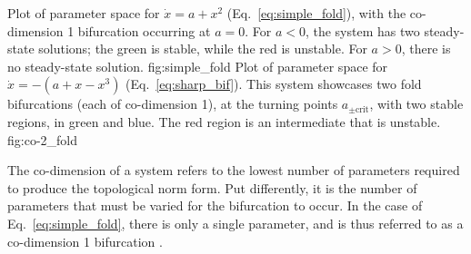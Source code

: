 	{Plot of parameter space for $\dot{x} = a + x^2$ (Eq.~\ref{eq:simple_fold}), with the co-dimension 1 bifurcation occurring at $a = 0$. %
	For $a < 0$, the system has two steady-state solutions; the green is stable, while the red is unstable.
	For $a > 0$, there is no steady-state solution.}
	{fig:simple_fold}
	{}
	{Plot of parameter space for $\dot{x} = -(a + x - x^3)$ (Eq.~\ref{eq:sharp_bif}). %
	This system showcases two fold bifurcations (each of co-dimension 1), at the turning points $a_{\pm\text{crit}}$, with two stable regions, in green and blue. %
	The red region is an intermediate that is unstable.}
	{fig:co-2_fold}

The co-dimension of a system refers to the lowest number of parameters required to produce the topological norm form.
Put differently, it is the number of parameters that must be varied for the bifurcation to occur.
In the case of Eq.~\ref{eq:simple_fold}, there is only a single parameter, and is thus referred to as a co-dimension 1 bifurcation \cite{weymiens_bifurcation_2014}.

